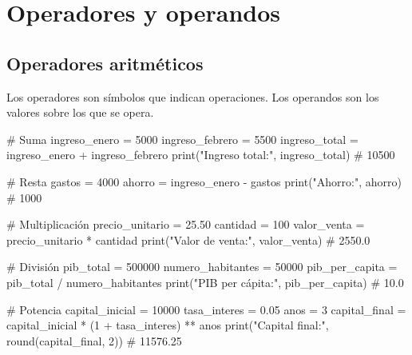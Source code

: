 \documentclass[
  doc,
  floatsintext,
  longtable,
  a4paper,
  nolmodern,
  notxfonts,
  notimes,
  12pt,
  colorlinks=true,linkcolor=blue,citecolor=blue,urlcolor=blue]{apa7}
\newenvironment{Shaded}{\begin{snugshade}}{\end{snugshade}}
\newcommand{\BuiltInTok}[1]{\textcolor[rgb]{0.00,0.23,0.31}{#1}}
\newcommand{\CommentTok}[1]{\textcolor[rgb]{0.37,0.37,0.37}{#1}}
\newcommand{\DecValTok}[1]{\textcolor[rgb]{0.68,0.00,0.00}{#1}}
\newcommand{\FloatTok}[1]{\textcolor[rgb]{0.68,0.00,0.00}{#1}}
\newcommand{\NormalTok}[1]{\textcolor[rgb]{0.00,0.23,0.31}{#1}}
\newcommand{\OperatorTok}[1]{\textcolor[rgb]{0.37,0.37,0.37}{#1}}
\newcommand{\StringTok}[1]{\textcolor[rgb]{0.13,0.47,0.30}{#1}}
\begin{document}
\section{Operadores y operandos}\label{operadores-y-operandos}

\subsection{Operadores aritméticos}\label{operadores-aritmuxe9ticos}

Los operadores son símbolos que indican operaciones. Los operandos son
los valores sobre los que se opera.

\begin{Shaded}
\begin{Highlighting}[]
\CommentTok{\# Suma}
\NormalTok{ingreso\_enero }\OperatorTok{=} \DecValTok{5000}
\NormalTok{ingreso\_febrero }\OperatorTok{=} \DecValTok{5500}
\NormalTok{ingreso\_total }\OperatorTok{=}\NormalTok{ ingreso\_enero }\OperatorTok{+}\NormalTok{ ingreso\_febrero}
\BuiltInTok{print}\NormalTok{(}\StringTok{"Ingreso total:"}\NormalTok{, ingreso\_total)  }\CommentTok{\# 10500}

\CommentTok{\# Resta}
\NormalTok{gastos }\OperatorTok{=} \DecValTok{4000}
\NormalTok{ahorro }\OperatorTok{=}\NormalTok{ ingreso\_enero }\OperatorTok{{-}}\NormalTok{ gastos}
\BuiltInTok{print}\NormalTok{(}\StringTok{"Ahorro:"}\NormalTok{, ahorro)  }\CommentTok{\# 1000}

\CommentTok{\# Multiplicación}
\NormalTok{precio\_unitario }\OperatorTok{=} \FloatTok{25.50}
\NormalTok{cantidad }\OperatorTok{=} \DecValTok{100}
\NormalTok{valor\_venta }\OperatorTok{=}\NormalTok{ precio\_unitario }\OperatorTok{*}\NormalTok{ cantidad}
\BuiltInTok{print}\NormalTok{(}\StringTok{"Valor de venta:"}\NormalTok{, valor\_venta)  }\CommentTok{\# 2550.0}

\CommentTok{\# División}
\NormalTok{pib\_total }\OperatorTok{=} \DecValTok{500000}
\NormalTok{numero\_habitantes }\OperatorTok{=} \DecValTok{50000}
\NormalTok{pib\_per\_capita }\OperatorTok{=}\NormalTok{ pib\_total }\OperatorTok{/}\NormalTok{ numero\_habitantes}
\BuiltInTok{print}\NormalTok{(}\StringTok{"PIB per cápita:"}\NormalTok{, pib\_per\_capita)  }\CommentTok{\# 10.0}

\CommentTok{\# Potencia}
\NormalTok{capital\_inicial }\OperatorTok{=} \DecValTok{10000}
\NormalTok{tasa\_interes }\OperatorTok{=} \FloatTok{0.05}
\NormalTok{anos }\OperatorTok{=} \DecValTok{3}
\NormalTok{capital\_final }\OperatorTok{=}\NormalTok{ capital\_inicial }\OperatorTok{*}\NormalTok{ (}\DecValTok{1} \OperatorTok{+}\NormalTok{ tasa\_interes) }\OperatorTok{**}\NormalTok{ anos}
\BuiltInTok{print}\NormalTok{(}\StringTok{"Capital final:"}\NormalTok{, }\BuiltInTok{round}\NormalTok{(capital\_final, }\DecValTok{2}\NormalTok{))  }\CommentTok{\# 11576.25}


\end{Highlighting}
\end{Shaded}
\end{document}
